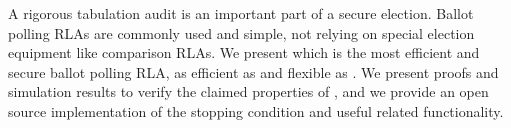 A rigorous tabulation audit is an important part of a secure election. Ballot polling RLAs are commonly used and simple, not relying on special election equipment like comparison RLAs. We present \Providence which is the most efficient and secure ballot polling RLA, as efficient as \Minerva  and flexible as \BRAVO. We present proofs and simulation results to verify the claimed properties of \Providence, and we provide an open source implementation of the stopping condition and useful related functionality.

